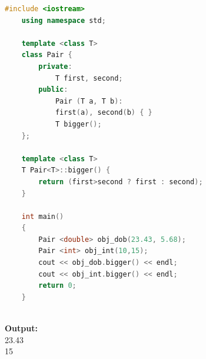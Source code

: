 \documentclass[12pt , a4paper]{article}
\begin{document}
	\begin{lstlisting}[language=C++]
	#include <iostream>
	using namespace std;
	
	template <class T>
	class Pair {
	    private:
	        T first, second;
	    public:
	        Pair (T a, T b):
	        first(a), second(b) { }
	        T bigger();
	};
	
	template <class T>
	T Pair<T>::bigger() {
	    return (first>second ? first : second);
	}
	
	int main()
	{
	    Pair <double> obj_dob(23.43, 5.68);
	    Pair <int> obj_int(10,15);
	    cout << obj_dob.bigger() << endl;
	    cout << obj_int.bigger() << endl;
	    return 0;
	}
	
	\end{lstlisting}

	\begin{tcolorbox}
	\textbf{Output:}\\
	23.43\\
	15
	\end{tcolorbox}
\end{document}
